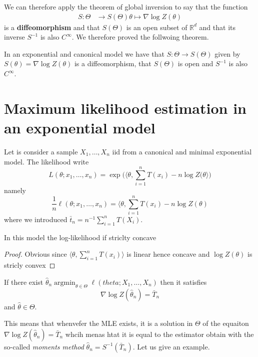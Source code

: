 \documentclass[
	fontsize=11pt, %
	twoside=false, %
	numbers=noenddot, %
]{kaobook}
\DeclareMathOperator*{\argmin}{argmin}
\newcommand{\R}{\mathbb R}
\newcommand{\wh}{\widehat}
\newcommand{\grad}{\nabla}
\begin{document}
We can therefore apply the theorem of global inversion to say that the function
\begin{align*}
	S : \Theta &\rightarrow S(\Theta)
	\theta \mapsto \grad \log Z(\theta)
\end{align*}
is a \textbf{diffeomorphism} and that $S(\Theta)$ is an open subset of $\R^d$ and that its inverse
$S^{-1}$ is also $C^\infty$.
We therefore proved the follwoing theorem.
\begin{theorem}
	In an exponential and canonical model we have that $S : \Theta \rightarrow S(\Theta)$ given by $S(\theta) = \grad \log Z(\theta)$ is a diffeomorphism, that $S(\Theta)$ is open and $S^{-1}$ is also $C^\infty$.
\end{theorem} 

\section{Maximum likelihood estimation in an exponential model} %
\label{sec:maximum_likelihood_estimation_in_an_exponential_model}

Let is consider a sample $X_1, \ldots, X_n$ iid from a canonical and minimal exponential model.
The likelihood write
\begin{equation*}
	L(\theta; x_1, \ldots, x_n) = \exp \Big( \langle \theta, \sum_{i=1}^n T(x_i) - n \log Z(\theta \rangle \Big)
\end{equation*}
namely 
\begin{equation*}
	\frac 1n \ell(\theta; x_1, \ldots, x_n) = \langle \theta, \sum_{i=1}^n T(x_i) 
	- n \log Z(\theta)
\end{equation*}
where we introduced $\bar t_n = n^{-1} \sum_{i=1}^n T(X_i)$.

\begin{proposition}
	In this model the log-likelihood if striclty concave
\end{proposition}

\begin{proof}
Obvious since $\langle \theta, \sum_{i=1}^n T(x_i) \rangle$ is linear hence concave and $\log Z(\theta)$ is stricly convex
\end{proof}

\begin{proposition}
	If there exist $\wh \theta_n \argmin_{\theta \in \Theta} \ell(theta; X_1, \ldots, X_n)$ then it satisfies
	\begin{equation*}
		 \grad \log Z(\wh \theta_n) = \bar T_n
	\end{equation*}
	and $\wh \theta \in \Theta$.
\end{proposition}
This means that whenvefer the MLE exists, it is a solution in $\Theta$ of the equaiton $ \grad \log Z(\wh \theta_n) = \bar T_n$ whcih menas htat it is equal to the estimator obtain with the so-called \emph{moments method} $\wh \theta_n = S^{-1}(\bar T_n)$.
Let us give an example.
\end{document}

